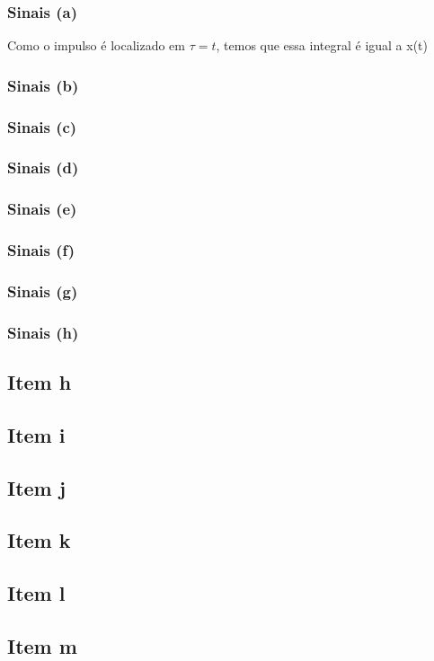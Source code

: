 \documentclass[a4paper, 12pt]{article}
\begin{document}
			\subsubsection{Sinais (a)}
			Como o impulso é localizado em $\tau = t$, temos que essa integral é igual a x(t)
			\subsubsection{Sinais (b)}
			\subsubsection{Sinais (c)}
			\subsubsection{Sinais (d)}
			\subsubsection{Sinais (e)}
			\subsubsection{Sinais (f)}
			\subsubsection{Sinais (g)}
			\subsubsection{Sinais (h)}
		\subsection{Item h}	
		\subsection{Item i}	
		\subsection{Item j}	
		\subsection{Item k}	
		\subsection{Item l}	
		\subsection{Item m}	
\end{document}
